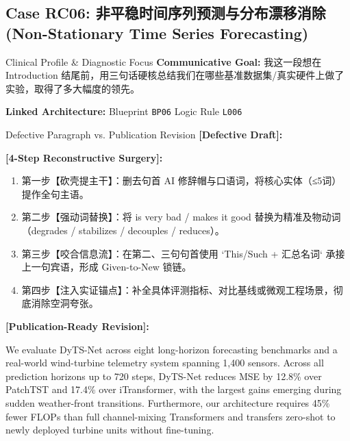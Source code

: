 \subsection{Case RC06: 非平稳时间序列预测与分布漂移消除 (Non-Stationary Time Series Forecasting)}\label{case:RC06}
\begin{ConceptBox}{Clinical Profile \& Diagnostic Focus}
\textbf{Communicative Goal:} 我这一段想在 Introduction 结尾前，用三句话硬核总结我们在哪些基准数据集/真实硬件上做了实验，取得了多大幅度的领先。\par
\textbf{Linked Architecture:} Blueprint \texttt{BP06} \enspace\textbar\enspace Logic Rule \texttt{L006}
\end{ConceptBox}
\begin{ExampleBox}{Defective Paragraph vs. Publication Revision}
\textbf{\color{TargetHighlight}[Defective Draft]:}\par
{}\par\vspace{6pt}
\textbf{\color{AcadForest}[4-Step Reconstructive Surgery]:}
\begin{enumerate}[label=\textbf{\color{AcadNavy}Step \arabic*:}, leftmargin=2em]
  \item 第一步【砍壳提主干】：删去句首 AI 修辞帽与口语词，将核心实体（≤5词）提作全句主语。
  \item 第二步【强动词替换】：将 is very bad / makes it good 替换为精准及物动词（degrades / stabilizes / decouples / reduces）。
  \item 第三步【咬合信息流】：在第二、三句句首使用 `This/Such + 汇总名词` 承接上一句宾语，形成 Given-to-New 锁链。
  \item 第四步【注入实证锚点】：补全具体评测指标、对比基线或微观工程场景，彻底消除空洞夸张。
\end{enumerate}\vspace{4pt}
\textbf{\color{AcadNavy}[Publication-Ready Revision]:}\par
We evaluate DyTS-Net across eight long-horizon forecasting benchmarks and a real-world wind-turbine telemetry system spanning 1,400 sensors. Across all prediction horizons up to 720 steps, DyTS-Net reduces MSE by 12.8\% over PatchTST and 17.4\% over iTransformer, with the largest gains emerging during sudden weather-front transitions. Furthermore, our architecture requires 45\% fewer FLOPs than full channel-mixing Transformers and transfers zero-shot to newly deployed turbine units without fine-tuning.
\end{ExampleBox}
